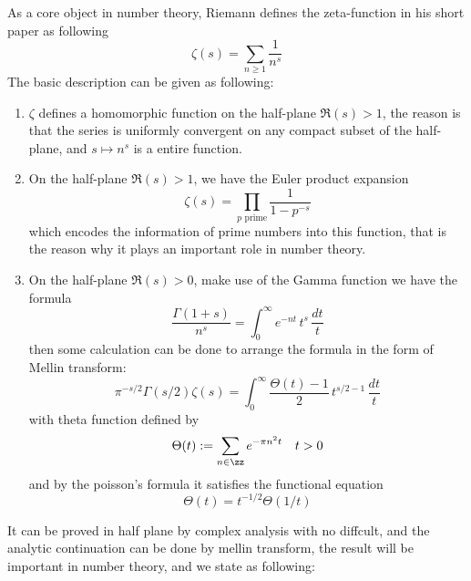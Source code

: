 As a core object in number theory, Riemann defines the zeta-function in his short paper \cite{Riemann} as following
\[\zeta(s) = \sum_{n \geq 1}\frac{1}{n^s}\]
The basic description can be given as following:
\begin{enumerate}
    \item \(\zeta\) defines a homomorphic function on the half-plane \(\Re(s) >1\), the reason is that the series is uniformly convergent on any compact subset of the half-plane, and \(s \mapsto n^s\) is a entire function.
    
    \item On the half-plane \(\Re(s) > 1\), we have the Euler product expansion
    \[\zeta(s) = \prod_{p \text{ prime}} \frac{1}{1 - p^{-s}}\]
    which encodes the information of prime numbers into this function, that is the reason why it plays an important role in number theory.

    \item On the half-plane \(\Re(s) > 0\), make use of the Gamma function we have the formula
    \[\frac{\Gamma(1+s)}{n^s} = \int_{0}^{\infty} e^{-nt}\, t^{s} \, \frac{dt}{t}\]
    then some calculation can be done to arrange the formula in the form of Mellin transform:
    \begin{equation} \label{integralrepofzeta}
        \pi^{-s/2} \Gamma(s/2) \zeta(s) =  \int_0^\infty \frac{\Theta(t) -1}{2} \, t^{s/2-1} \, \frac{dt}{t}
    \end{equation}
    with theta function defined by
    \[\Theta(t) := \sum_{n \in \zz}e^{-\pi n^2 t} \quad t>0 \]
    and by the poisson's formula it satisfies the functional equation 
    \begin{equation} \label{fctequationoftheta}
    \Theta(t) = t^{-1/2}\Theta(1/t)
    \end{equation}
\end{enumerate}

It can be proved in half plane by complex analysis with no diffcult, and the analytic continuation can be done by mellin transform, the result will be important in number theory, and we state as following:

